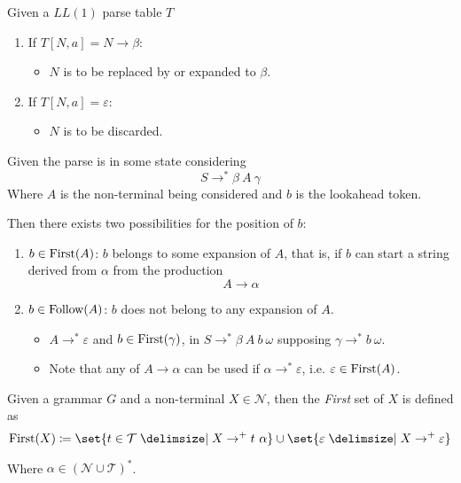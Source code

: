 \begin{definition}
    Given a $LL(1)$ parse table $T$
    \begin{enumerate}
        \item If $T[N, a] = N \to \beta$:
        \begin{itemize}
            \item $N$ is to be replaced by or expanded to $\beta$.
        \end{itemize}
        \item If $T[N, a] = \varepsilon$:
        \begin{itemize}
            \item $N$ is to be discarded.
        \end{itemize}
    \end{enumerate}
\end{definition}

\begin{definition}
    Given the parse is in some state considering
    \begin{equation}
        S \to^\ast \beta\ A\ \gamma
    \end{equation}
    Where $A$ is the non-terminal being considered and $b$ is the lookahead token.
    
    Then there exists two possibilities for the position of $b$:
    \begin{enumerate}
        \item $b \in \mathrm{First}{(A)}$: $b$ belongs to some expansion of $A$, that is, if $b$ can start a string derived from $\alpha$ from the production
        \begin{equation}
            A \to \alpha
        \end{equation}
        \item $b \in \mathrm{Follow}{(A)}$: $b$ does not belong to any expansion of $A$.
        \begin{itemize}
            \item $A \to^\ast \varepsilon$ and $b \in \mathrm{First}{(\gamma)}$, in $S \to^\ast \beta\ A\ b\ \omega$ supposing $\gamma \to^\ast b\ \omega$.
            \item Note that any of $A \to \alpha$ can be used if $\alpha \to^\ast \varepsilon$, i.e. $\varepsilon \in \mathrm{First}{(A)}$.
        \end{itemize}
    \end{enumerate}
\end{definition}

\begin{definition}
    Given a grammar $G$ and a non-terminal $X \in \mathcal{N}$, then the \textit{First} set of $X$ is defined as
    \begin{equation}
        \First{X} \coloneqq \set{t \in \mathcal{T} \given X \to^+ t\ \alpha} \cup \set{\varepsilon \given X \to^+ \varepsilon}
    \end{equation}
    
    Where $\alpha \in (\mathcal{N} \cup \mathcal{T})^\ast$.
\end{definition}

